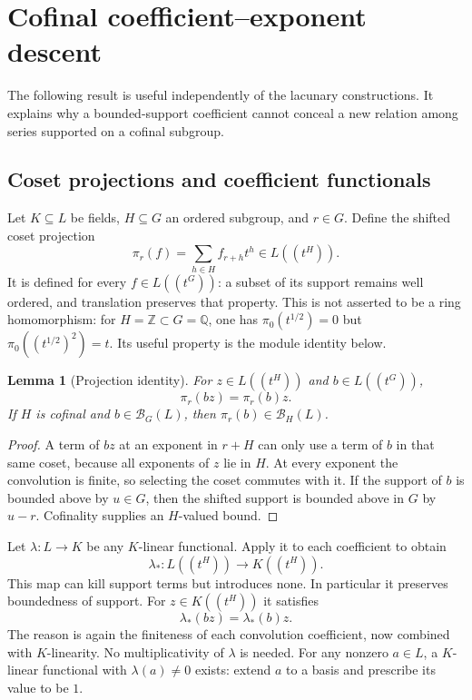 \documentclass[11pt,letterpaper]{article}
\newtheorem{lemma}[theorem]{Lemma}
\theoremstyle{definition}
\theoremstyle{remark}
\newcommand{\Q}{\mathbb Q}
\newcommand{\Z}{\mathbb Z}
\newcommand{\HH}[2]{#1((t^{#2}))}
\newcommand{\BB}[2]{\mathcal B_{#2}(#1)}
\begin{document}
\section{Cofinal coefficient--exponent descent}\label{bst:sec:descent}

The following result is useful independently of the lacunary constructions.
It explains why a bounded-support coefficient cannot conceal a new relation
among series supported on a cofinal subgroup.

\subsection{Coset projections and coefficient functionals}

Let $K\subseteq L$ be fields, $H\subseteq G$ an ordered subgroup, and
$r\in G$. Define the shifted coset projection
\begin{equation}\label{bst:eq:projection}
 \pi_r(f)=\sum_{h\in H}f_{r+h}t^h\in\HH LH.
\end{equation}
It is defined for every $f\in\HH LG$: a subset of its support remains well
ordered, and translation preserves that property. This is not asserted to
be a ring homomorphism: for $H=\Z\subset G=\Q$, one has
$\pi_0(t^{1/2})=0$ but $\pi_0((t^{1/2})^2)=t$. Its useful property
is the module identity below.

\begin{lemma}[Projection identity]\label{bst:lem:projection}
For $z\in\HH LH$ and $b\in\HH LG$,
\[
 \pi_r(bz)=\pi_r(b)z.
\]
If $H$ is cofinal and $b\in\BB LG$, then $\pi_r(b)\in\BB LH$.
\end{lemma}
\begin{proof}
A term of $bz$ at an exponent in $r+H$ can only use a term of $b$ in that
same coset, because all exponents of $z$ lie in $H$. At every exponent the
convolution is finite, so selecting the coset commutes with it. If the
support of $b$ is bounded above by $u\in G$, then the shifted support is
bounded above in $G$ by $u-r$. Cofinality supplies an $H$-valued bound.
\end{proof}

Let $\lambda:L\to K$ be any $K$-linear functional. Apply it to each
coefficient to obtain
\[
 \lambda_*:\HH LH\longrightarrow\HH KH.
\]
This map can kill support terms but introduces none. In particular it
preserves boundedness of support. For $z\in\HH KH$ it satisfies
\begin{equation}\label{bst:eq:lambda}
 \lambda_*(bz)=\lambda_*(b)z.
\end{equation}
The reason is again the finiteness of each convolution coefficient, now
combined with $K$-linearity. No multiplicativity of $\lambda$ is needed.
For any nonzero $a\in L$, a $K$-linear functional with $\lambda(a)\ne0$
exists: extend $a$ to a basis and prescribe its value to be $1$.
\end{document}
